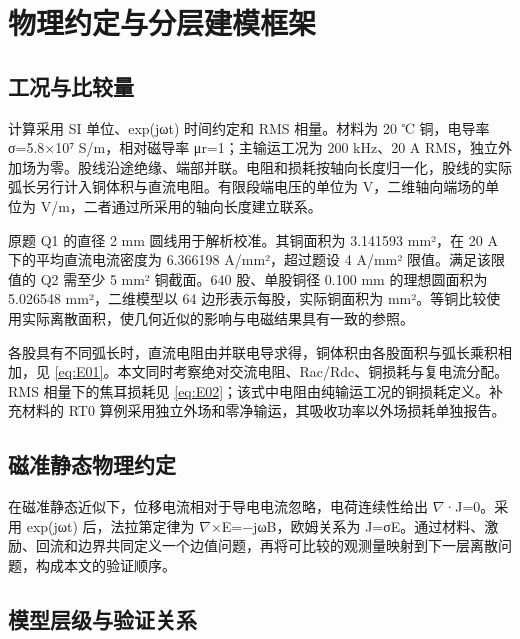 \section{物理约定与分层建模框架}
\label{chapter:02}

\hypertarget{02.conventions.heading}{}
\subsection{工况与比较量}

\hypertarget{02.conventions.p1}{}
计算采用 SI 单位、exp(jωt) 时间约定和 RMS 相量。材料为 20 ℃ 铜，电导率 σ=5.8×10⁷ S/m，相对磁导率 μr=1；主输运工况为 200 kHz、20 A RMS，独立外加场为零。股线沿途绝缘、端部并联。电阻和损耗按轴向长度归一化，股线的实际弧长另行计入铜体积与直流电阻。有限段端电压的单位为 V，二维轴向端场的单位为 V/m，二者通过所采用的轴向长度建立联系。

\hypertarget{02.conventions.p2}{}
原题 Q1 的直径 2 mm 圆线用于解析校准。其铜面积为 3.141593 mm²，在 20 A 下的平均直流电流密度为 6.366198 A/mm²，超过题设 4 A/mm² 限值。满足该限值的 Q2 需至少 5 mm² 铜截面。640 股、单股铜径 0.100 mm 的理想圆面积为 5.026548 mm²，二维模型以 64 边形表示每股，实际铜面积为  mm²。等铜比较使用实际离散面积，使几何近似的影响与电磁结果具有一致的参照。

\hypertarget{02.conventions.p3}{}
各股具有不同弧长时，直流电阻由并联电导求得，铜体积由各股面积与弧长乘积相加，见 \eqref{eq:E01}。本文同时考察绝对交流电阻、Rac/Rdc、铜损耗与复电流分配。RMS 相量下的焦耳损耗见 \eqref{eq:E02}；该式中电阻由纯输运工况的铜损耗定义。补充材料的 RT0 算例采用独立外场和零净输运，其吸收功率以外场损耗单独报告。

\hypertarget{02.maxwell.heading}{}
\subsection{磁准静态物理约定}

\hypertarget{02.maxwell.p1}{}
在磁准静态近似下，位移电流相对于导电电流忽略，电荷连续性给出 \(\nabla\)·J=0。采用 exp(jωt) 后，法拉第定律为 \(\nabla\)×E=−jωB，欧姆关系为 J=σE。通过材料、激励、回流和边界共同定义一个边值问题，再将可比较的观测量映射到下一层离散问题，构成本文的验证顺序。

\hypertarget{02.hierarchy.heading}{}
\subsection{模型层级与验证关系}

